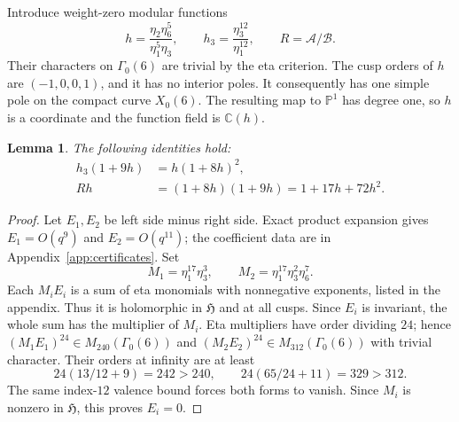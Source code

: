 \documentclass[11pt,a4paper]{article}
\newtheorem{lemma}[theorem]{Lemma}
\theoremstyle{remark}\newtheorem{remark}[theorem]{Remark}
\newcommand{\C}{\mathbb C}\newcommand{\Fp}{\mathbb F_p}
\newcommand{\HH}{\mathfrak H}
\newcommand{\A}{\mathcal A}\newcommand{\B}{\mathcal B}
\begin{document}
Introduce weight-zero modular functions
\begin{equation}\label{eq:h-h3-R}
 h=\frac{\eta_2\eta_6^5}{\eta_1^5\eta_3},\qquad
 h_3=\frac{\eta_3^{12}}{\eta_1^{12}},\qquad R=\A/\B.
\end{equation}
Their characters on $\Gamma_0(6)$ are trivial by the eta criterion.
The cusp orders of $h$ are $(-1,0,0,1)$, and it has no interior poles.
It consequently has one simple pole on the compact curve $X_0(6)$.
The resulting map to $\mathbb P^1$ has degree one, so $h$ is a coordinate
and the function field is $\C(h)$.

\begin{lemma}\label{lem:E}
The following identities hold:
\begin{align}
 h_3(1+9h)&=h(1+8h)^2,\label{eq:E1}\\
 Rh&=(1+8h)(1+9h)=1+17h+72h^2.\label{eq:E2}
\end{align}
\end{lemma}
\begin{proof}
Let $E_1,E_2$ be left side minus right side. Exact product expansion gives
$E_1=O(q^9)$ and $E_2=O(q^{11})$; the coefficient data are in
Appendix~\ref{app:certificates}. Set
\[
 M_1=\eta_1^{17}\eta_3^3,\qquad
 M_2=\eta_1^{17}\eta_3^2\eta_6^7.
\]
Each $M_iE_i$ is a sum of eta monomials with nonnegative exponents, listed
in the appendix. Thus it is holomorphic in $\HH$ and at all cusps.
Since $E_i$ is invariant, the whole sum has the multiplier of $M_i$.
Eta multipliers have order dividing $24$; hence
$(M_1E_1)^{24}\in M_{240}(\Gamma_0(6))$ and
$(M_2E_2)^{24}\in M_{312}(\Gamma_0(6))$ with trivial character.
Their orders at infinity are at least
\[
 24(13/12+9)=242>240,\qquad
 24(65/24+11)=329>312.
\]
The same index-$12$ valence bound forces both forms to vanish.
Since $M_i$ is nonzero in $\HH$, this proves $E_i=0$.
\end{proof}
\end{document}
